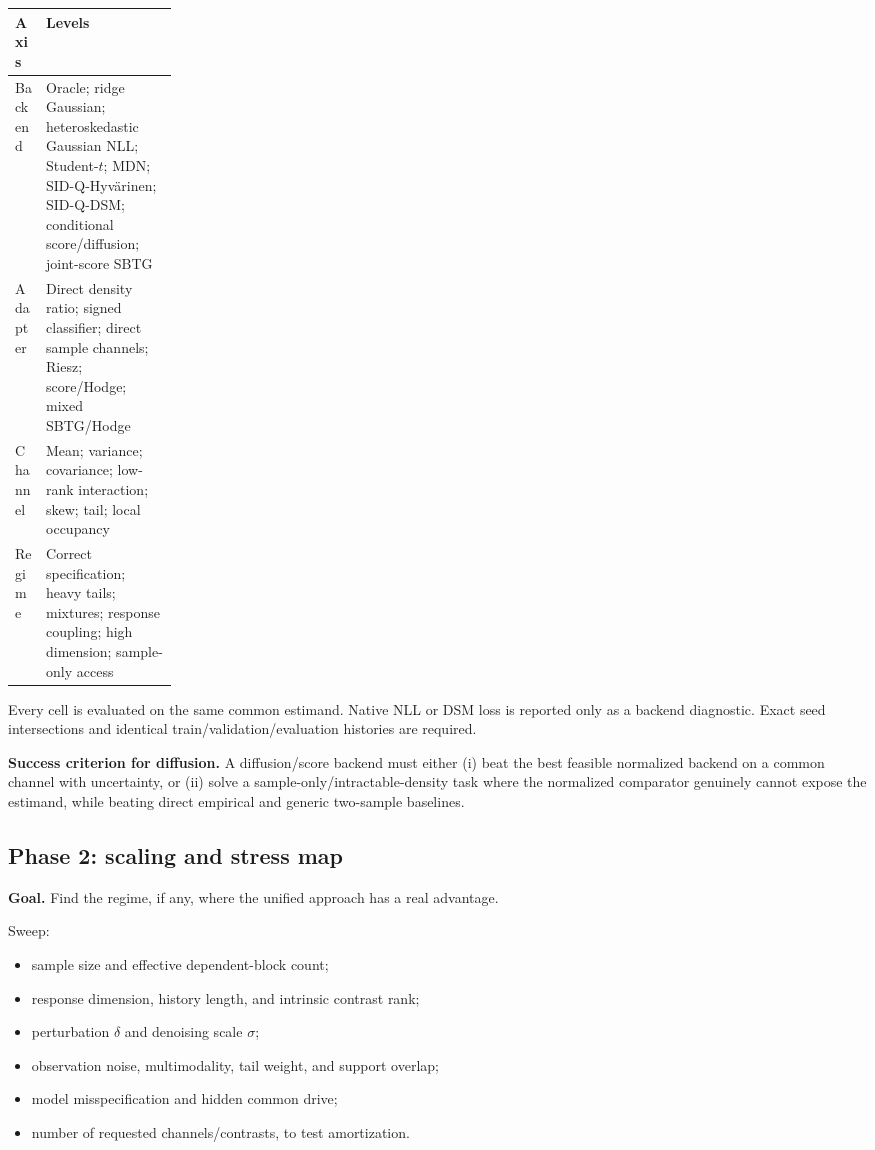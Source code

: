 \documentclass[10pt]{article}
\newcommand{\SIDQ}{\textnormal{\textsc{SID-Q}}\xspace}
\begin{document}
\begin{center}
\begin{tabularx}{\linewidth}{@{}p{0.19\linewidth}X@{}}
\toprule
Axis & Levels \\
\midrule
Backend & Oracle; ridge Gaussian; heteroskedastic Gaussian NLL; Student-\(t\); MDN; \SIDQ-Hyv\"arinen; \SIDQ-DSM; conditional score/diffusion; joint-score SBTG \\
Adapter & Direct density ratio; signed classifier; direct sample channels; Riesz; score/Hodge; mixed SBTG/Hodge \\
Channel & Mean; variance; covariance; low-rank interaction; skew; tail; local occupancy \\
Regime & Correct specification; heavy tails; mixtures; response coupling; high dimension; sample-only access \\
\bottomrule
\end{tabularx}
\end{center}

Every cell is evaluated on the same common estimand. Native NLL or DSM loss is reported only as a backend diagnostic. Exact seed intersections and identical train/validation/evaluation histories are required.

\textbf{Success criterion for diffusion.} A diffusion/score backend must either (i) beat the best feasible normalized backend on a common channel with uncertainty, or (ii) solve a sample-only/intractable-density task where the normalized comparator genuinely cannot expose the estimand, while beating direct empirical and generic two-sample baselines.

\subsection{Phase 2: scaling and stress map}

\textbf{Goal.} Find the regime, if any, where the unified approach has a real advantage.

Sweep:

\begin{itemize}
  \item sample size and effective dependent-block count;
  \item response dimension, history length, and intrinsic contrast rank;
  \item perturbation \(\delta\) and denoising scale \(\sigma\);
  \item observation noise, multimodality, tail weight, and support overlap;
  \item model misspecification and hidden common drive;
  \item number of requested channels/contrasts, to test amortization.
\end{itemize}
\end{document}

